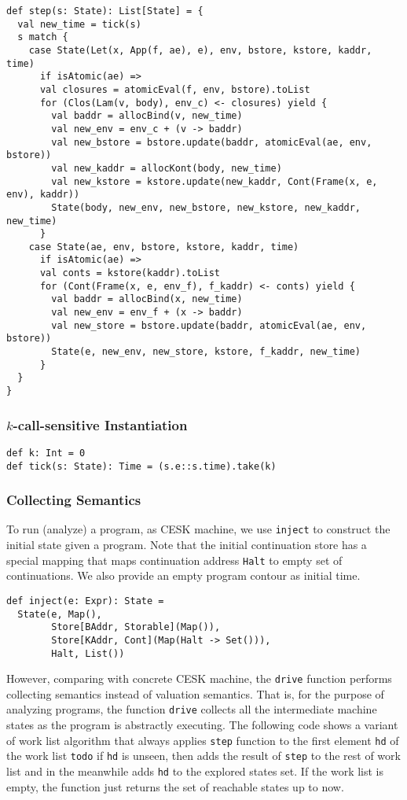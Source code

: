 \documentclass[acmsmall,review,anonymous]{acmart}\settopmatter{printfolios=true,printccs=false,printacmref=false}
\begin{document}
\begin{verbatim}
def step(s: State): List[State] = {
  val new_time = tick(s)
  s match {
    case State(Let(x, App(f, ae), e), env, bstore, kstore, kaddr, time) 
      if isAtomic(ae) =>
      val closures = atomicEval(f, env, bstore).toList
      for (Clos(Lam(v, body), env_c) <- closures) yield {
        val baddr = allocBind(v, new_time)
        val new_env = env_c + (v -> baddr)
        val new_bstore = bstore.update(baddr, atomicEval(ae, env, bstore))
        val new_kaddr = allocKont(body, new_time)
        val new_kstore = kstore.update(new_kaddr, Cont(Frame(x, e, env), kaddr))
        State(body, new_env, new_bstore, new_kstore, new_kaddr, new_time)
      }
    case State(ae, env, bstore, kstore, kaddr, time) 
      if isAtomic(ae) =>
      val conts = kstore(kaddr).toList
      for (Cont(Frame(x, e, env_f), f_kaddr) <- conts) yield {
        val baddr = allocBind(x, new_time)
        val new_env = env_f + (x -> baddr)
        val new_store = bstore.update(baddr, atomicEval(ae, env, bstore))
        State(e, new_env, new_store, kstore, f_kaddr, new_time)
      }
  }
}
\end{verbatim}

\subsubsection{$k$-call-sensitive Instantiation} \label{kcfainst}

\begin{verbatim}
def k: Int = 0
def tick(s: State): Time = (s.e::s.time).take(k)
\end{verbatim}

\subsubsection{Collecting Semantics}

To run (analyze) a program, as CESK machine, we use \texttt{inject} to construct
the initial state given a program. 
Note that the initial continuation store has a special mapping that maps continuation address
\texttt{Halt} to empty set of continuations.
We also provide an empty program contour as initial time.
\begin{verbatim}
def inject(e: Expr): State = 
  State(e, Map(), 
        Store[BAddr, Storable](Map()), 
        Store[KAddr, Cont](Map(Halt -> Set())), 
        Halt, List())
\end{verbatim}

However, comparing with concrete CESK machine, the
\texttt{drive} function performs collecting semantics instead of valuation
semantics. That is, for the purpose of analyzing programs, the function \texttt{drive}
collects all the intermediate machine states as the program is abstractly executing.
The following code shows a variant of work list algorithm that always applies \texttt{step}
function to the first element \texttt{hd} of the work list \texttt{todo} if \texttt{hd}
is unseen, then adds the result of \texttt{step} to the rest of work list and in 
the meanwhile adds \texttt{hd} to the explored states set.
If the work list is empty, the function just returns the set of reachable states up to now.
\end{document}

